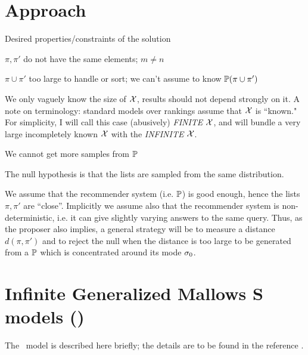 \documentclass[10pt]{article}
\begin{document}
\section{Approach}
\label{sec:approach}
Desired properties/constraints of the solution
\benum
\item $\pi,\pi'$ do not have the same elements; $m\neq n$
\item $\pi \cup \pi'$ too large to handle or sort; we can't assume to know ${\mathbb P}(\pi \cup \pi')$
\item We only vaguely know the size of ${\mathcal X}$, results should not depend strongly on it. A note on terminology: standard models over rankings assume that ${\mathcal X}$ is ``known." For simplicity, I will call this case (abusively) {\em FINITE} ${\mathcal X}$, and will bundle a very large incompletely known ${\mathcal X}$ with the {\em INFINITE} ${\mathcal X}$.
\item We cannot get more samples from ${\mathbb P}$
\item The null hypothesis is that the lists are sampled from the same distribution.
\item We assume that the recommender system (i.e. ${\mathbb P}$) is good enough, hence the lists $\pi,\pi'$ are ``close''. Implicitly we assume also that the recommender system is non-deterministic, i.e. it can give slightly varying answers to the same query.  
  \eenum
Thus, as the proposer also implies, a general strategy will be to measure a distance $d(\pi,\pi')$ and to reject the null when the distance is too large to be generated from a ${\mathbb P}$ which is concentrated around its mode $\sigma_0$. 

\section{Infinite Generalized Mallows S models (\gmms)}
\label{sec:gmms}

The \gmms~model is described here briefly; the details are to be found in the reference
\cite{MBao}.
\end{document}
